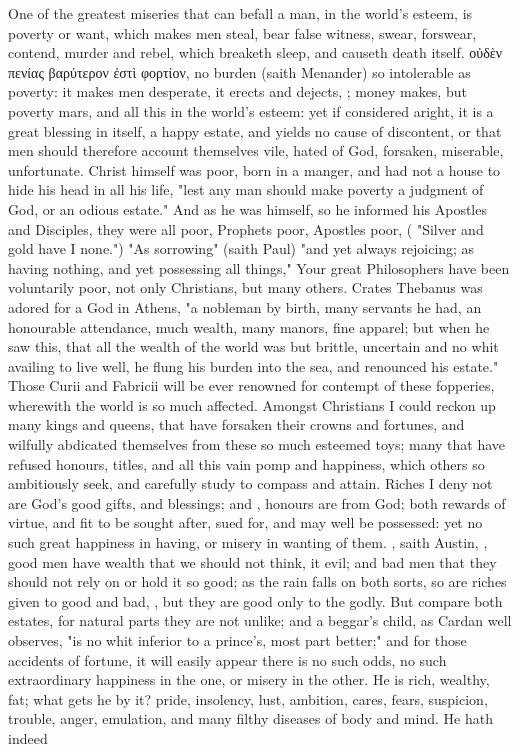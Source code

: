 {One of the greatest miseries that can befall a man, in the world's esteem, is poverty or want, which makes men steal, bear false witness, swear, forswear, contend, murder and rebel, which breaketh sleep, and causeth death itself. \textgreek[variant=ancient]{οὐδὲν πενίας βαρύτερον ἐστὶ φορτίον}, no burden (saith Menander) so intolerable as poverty: it makes men desperate, it erects and dejects, ; money makes, but poverty mars, \etc{} and all this in the world's esteem: yet if considered aright, it is a great blessing in itself, a happy estate, and yields no cause of discontent, or that men should therefore account themselves vile, hated of God, forsaken, miserable, unfortunate. Christ himself was poor, born in a manger, and had not a house to hide his head in all his life, "lest any man should make poverty a judgment of God, or an odious estate." And as he was himself, so he informed his Apostles and Disciples, they were all poor, Prophets poor, Apostles poor, ( "Silver and gold have I none.") "As sorrowing" (saith Paul) "and yet always rejoicing; as having nothing, and yet possessing all things,"  Your great Philosophers have been voluntarily poor, not only Christians, but many others. Crates Thebanus was adored for a God in Athens, "a nobleman by birth, many servants he had, an honourable attendance, much wealth, many manors, fine apparel; but when he saw this, that all the wealth of the world was but brittle, uncertain and no whit availing to live well, he flung his burden into the sea, and renounced his estate." Those Curii and Fabricii will be ever renowned for contempt of these fopperies, wherewith the world is so much affected. Amongst Christians I could reckon up many kings and queens, that have forsaken their crowns and fortunes, and wilfully abdicated themselves from these so much esteemed toys; many that have refused honours, titles, and all this vain pomp and happiness, which others so ambitiously seek, and carefully study to compass and attain. Riches I deny not are God's good gifts, and blessings; and , honours are from God; both rewards of virtue, and fit to be sought after, sued for, and may well be possessed: yet no such great happiness in having, or misery in wanting of them. , saith Austin, , good men have wealth that we should not think, it evil; and bad men that they should not rely on or hold it so good; as the rain falls on both sorts, so are riches given to good and bad, , but they are good only to the godly. But compare both estates, for natural parts they are not unlike; and a beggar's child, as Cardan well observes, "is no whit inferior to a prince's, most part better;" and for those accidents of fortune, it will easily appear there is no such odds, no such extraordinary happiness in the one, or misery in the other. He is rich, wealthy, fat; what gets he by it? pride, insolency, lust, ambition, cares, fears, suspicion, trouble, anger, emulation, and many filthy diseases of body and mind. He hath indeed }
